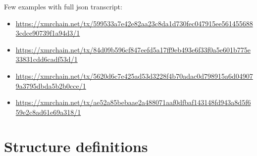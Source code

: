 \documentclass[]{article}
\begin{document}

Few examples with full json transcript:
\begin{itemize}
	\item \footnotesize\url{https://xmrchain.net/tx/599533a7e42e82aa23c8da1d730fec047915ee5614556883cdce90739f1a94d3/1}
	
	\item \footnotesize\url{https://xmrchain.net/tx/84d09b596cf847eefd5a17ff9eb493e6f33f0a5e601b775e33831cdd6cadf53d/1}
	
	\item \footnotesize\url{https://xmrchain.net/tx/5620d6c7e425ad53d3228f4b70adac0d798915a6d049079a3795dbda5b2b0cce/1}
	
	\item \footnotesize\url{https://xmrchain.net/tx/ae52a85bebaae2a488071aaf0dfbaf143148fd943a8d5f659e2c8ad61e69a318/1}
\end{itemize}

\section{Structure definitions} \label{sec:structs}


\end{document}
